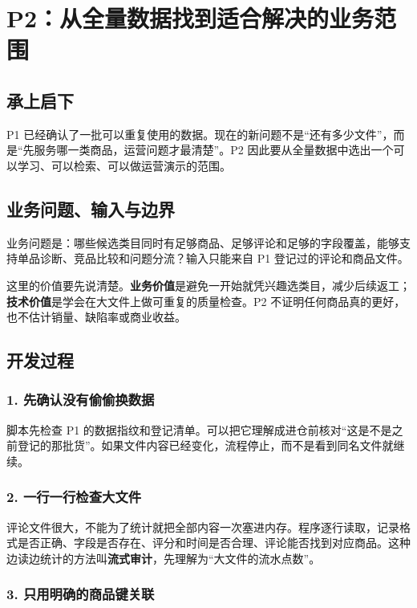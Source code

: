 \chapter{P2：从全量数据找到适合解决的业务范围}

\section{承上启下}

P1 已经确认了一批可以重复使用的数据。现在的新问题不是“还有多少文件”，而是“先服务哪一类商品，运营问题才最清楚”。P2 因此要从全量数据中选出一个可以学习、可以检索、可以做运营演示的范围。

\section{业务问题、输入与边界}

业务问题是：哪些候选类目同时有足够商品、足够评论和足够的字段覆盖，能够支持单品诊断、竞品比较和问题分流？输入只能来自 P1 登记过的评论和商品文件。

这里的价值要先说清楚。\textbf{业务价值}是避免一开始就凭兴趣选类目，减少后续返工；\textbf{技术价值}是学会在大文件上做可重复的质量检查。P2 不证明任何商品真的更好，也不估计销量、缺陷率或商业收益。

\section{开发过程}

\subsection{1. 先确认没有偷偷换数据}

脚本先检查 P1 的数据指纹和登记清单。可以把它理解成进仓前核对“这是不是之前登记的那批货”。如果文件内容已经变化，流程停止，而不是看到同名文件就继续。

\subsection{2. 一行一行检查大文件}

评论文件很大，不能为了统计就把全部内容一次塞进内存。程序逐行读取，记录格式是否正确、字段是否存在、评分和时间是否合理、评论能否找到对应商品。这种边读边统计的方法叫\textbf{流式审计}，先理解为“大文件的流水点数”。

\subsection{3. 只用明确的商品键关联}

